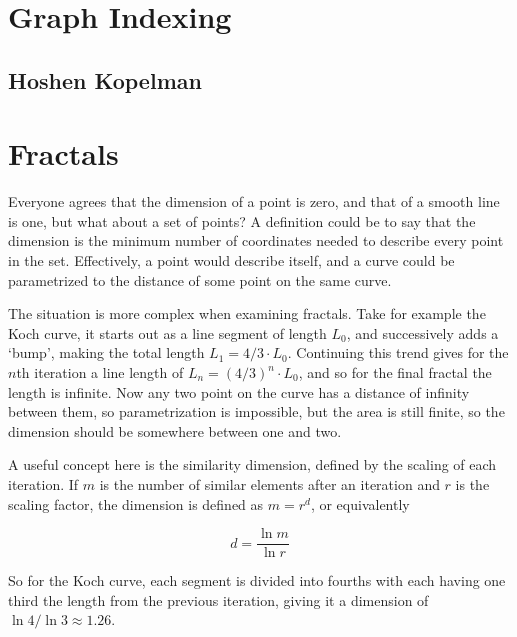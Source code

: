 \section{Graph Indexing}
\label{sec:GraphIndexing}

\subsection{Hoshen Kopelman}
\label{subsec:HoshenKopelman}

\section{Fractals}
\label{sec:fractals}

Everyone agrees that the dimension of a point is zero, and that of a smooth line is one, but what about a set of points? A definition could be to say that the dimension is the minimum number of coordinates needed to describe every point in the set. Effectively, a point would describe itself, and a curve could be parametrized to the distance of some point on the same curve.

The situation is more complex when examining fractals. Take for example the Koch curve, it starts out as a line segment of length $L_0$, and successively adds a `bump', making the total length $L_1 = 4/3 \cdot L_0$. Continuing this trend gives for the $n$th iteration a line length of $L_n = {(4 / 3)}^n \cdot L_0$, and so for the final fractal the length is infinite. Now any two point on the curve has a distance of infinity between them, so parametrization is impossible, but the area is still finite, so the dimension should be somewhere between one and two.

A useful concept here is the similarity dimension, defined by the scaling of each iteration. If $m$ is the number of similar elements after an iteration and $r$ is the scaling factor, the dimension is defined as $m = r^d$, or equivalently

\begin{equation}
	d = \frac{\ln m}{\ln r}
\end{equation}

So for the Koch curve, each segment is divided into fourths with each having one third the length from the previous iteration, giving it a dimension of $\ln 4 / \ln 3 \approx 1.26$.


